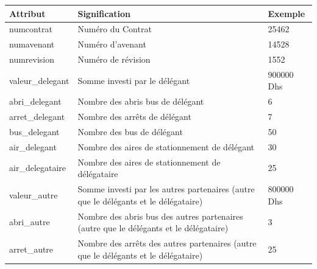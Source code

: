 \documentclass[a4paper]{report}
\begin{document}
\begin{doublespace}
	\begin{table}[H]
		\begin{center}
			\begin{tabularx}{17.5cm}{|p{2.5cm}|X|p{2.5cm}|}
				\hline
				\textbf{Attribut} & \textbf{Signification}                                                                              & \textbf{Exemple} \\
				\hline
				numcontrat        & Numéro du Contrat                                                                                   & 25462            \\
				\hline
				numavenant        & Numéro d'avenant                                                                                    & 14528            \\
				\hline
				numrevision       & Numéro de révision                                                                                  & 1552             \\
				\hline
				valeur\_delegant  & Somme investi par le délégant                                                                       & 900000 Dhs       \\
				\hline
				abri\_delegant    & Nombre des abris bus de délégant                                                                    & 6                \\
				\hline
				arret\_delegant   & Nombre des arrêts de délégant                                                                       & 7                \\
				\hline
				bus\_delegant     & Nombre des bus de délégant                                                                          & 50               \\
				\hline
				air\_delegant     & Nombre des aires de stationnement de délégant                                                       & 30               \\
				\hline
				air\_delegataire  & Nombre des aires de stationnement de délégataire                                                    & 25               \\
				\hline
				valeur\_autre     & Somme investi par les autres partenaires (autre que le délégants et le délégataire)                 & 800000 Dhs       \\
				\hline
				abri\_autre       & Nombre des abris bus des autres partenaires (autre que le délégants et le délégataire)              & 3                \\
				\hline
				arret\_autre      & Nombre des arrêts des autres partenaires (autre que le délégants et le délégataire)                 & 25               \\

\end{tabularx}
\end{center}
\end{table}
\end{doublespace}
\end{document}
